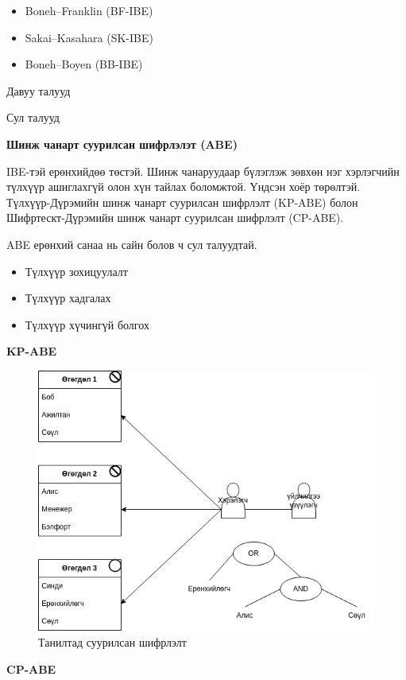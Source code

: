\begin{itemize}
    \item Boneh–Franklin (BF-IBE)
    \item Sakai–Kasahara (SK-IBE)
    \item Boneh–Boyen (BB-IBE)
\end{itemize}

Давуу талууд

Сул талууд

\textbf{Шинж чанарт суурилсан шифрлэлэт (ABE)}

IBE-тэй ерөнхийдөө төстэй. Шинж чанаруудаар бүлэглэж зөвхөн нэг хэрлэгчийн түлхүүр ашиглахгүй олон хүн тайлах боломжтой.
Үндсэн хоёр төрөлтэй. Түлхүүр-Дүрэмийн шинж чанарт суурилсан шифрлэлт (KP-ABE) болон Шифртескт-Дүрэмийн шинж чанарт суурилсан шифрлэлт (CP-ABE).

ABE ерөнхий санаа нь сайн болов ч сул талуудтай.
\begin{itemize}
    \item Түлхүүр зохицуулалт
    \item Түлхүүр хадгалах
    \item Түлхүүр хүчингүй болгох
\end{itemize}

\textbf{KP-ABE}

\begin{figure}[ht]
    \centering
    \includegraphics[scale=0.6]{Figures/kp-abe.drawio.png}
    \caption[IBE]{Танилтад суурилсан шифрлэлт}
\label{fig:kp-abe}
\end{figure}

\textbf{CP-ABE}\\

